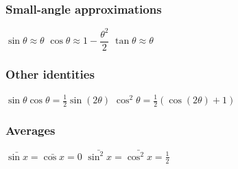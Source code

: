 \subsubsection{Small-angle approximations}
\begin{itemize}
\itemt \( \sin\theta \approx \theta \)
\itemt \( \cos\theta \approx 1 - \dfrac{\theta^2}{2} \)
\itemt \( \tan\theta \approx \theta \)
\end{itemize}

\subsubsection{Other identities}
\begin{itemize}
\itemt \( \sin \theta \cos \theta = \frac{1}{2} \sin(2\theta) \)
\itemt \( \cos^2\theta = \frac{1}{2} (\cos(2\theta)+1) \)
\end{itemize}

\subsubsection{Averages}
\begin{itemize}
\itemt \( \bar{\sin x} = \bar{\cos x} = 0 \)
\itemt \( \bar{\sin^2x} = \bar{\cos^2x}= \frac{1}{2} \)
\end{itemize}

\def\arraystretch{2.8}
